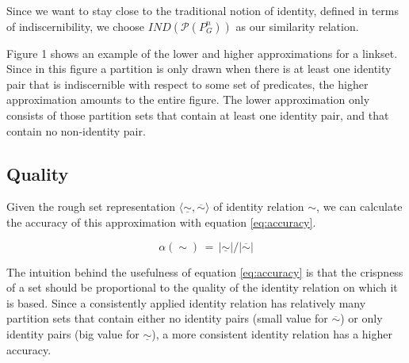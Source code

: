 \documentclass[letterpaper]{article}
\newtheorem{definition}{Definition}
\newcommand{\cardinality}[1]{\lvert#1\rvert}
\newcommand{\pair}[2]{\langle#1,#2\rangle}
\newcommand{\set}[1]{\{#1\}}
\begin{document}

\noindent Since we want to stay close to the traditional notion of identity,
  defined in terms of indiscernibility,
  we choose $\mathit{IND}(\mathcal{P}(P_G^n))$ as our similarity relation.

Figure 1 shows an example of the lower and higher
  approximations for a linkset.
Since in this figure a partition is only drawn when there is at least one
  identity pair that is indiscernible with respect to some set of
  predicates, the higher approximation amounts to the entire figure.
The lower approximation only consists of those partition sets that contain
  at least one identity pair, and that contain no non-identity pair.

\subsection{Quality}
\label{sec:quality}

Given the rough set representation $\pair{\underline{\sim}}{\overline{\sim}}$
  of identity relation $\sim$, we can calculate the accuracy of this
  approximation with equation \ref{eq:accuracy}.

\small
\begin{equation}
\label{eq:accuracy}
  \alpha(\sim)
\,=\,
  \cardinality{\underline{\sim}} / {\cardinality{\overline{\sim}}}
\end{equation}
\normalsize

The intuition behind the usefulness of equation \ref{eq:accuracy}
  is that the crispness of a set should be proportional to the quality
  of the identity relation on which it is based.
Since a consistently applied identity relation has relatively many
  partition sets that contain either
  no identity pairs (small value for $\overline{\sim}$) or
  only identity pairs (big value for $\underline{\sim}$),
  a more consistent identity relation has a higher accuracy.
\end{document}
